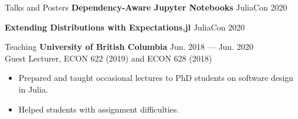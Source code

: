 \documentclass{resume} %
\begin{document}
\begin{rSection}{Talks and Posters}
    {\bf Dependency-Aware Jupyter Notebooks} \hfill {JuliaCon 2020}

    {\bf Extending Distributions with Expectations.jl} \hfill {JuliaCon 2020}
\end{rSection}

\begin{rSection}{Teaching}
    {\bf University of British Columbia} \hfill {Jun. 2018 --- Jun. 2020}
    \\ Guest Lecturer, ECON 622 (2019) and ECON 628 (2018)
    \begin{itemize}
        \item Prepared and taught occasional lectures to PhD students on software design in Julia.
        \item Helped students with assignment difficulties.
    \end{itemize}

\end{rSection}
\end{document}
